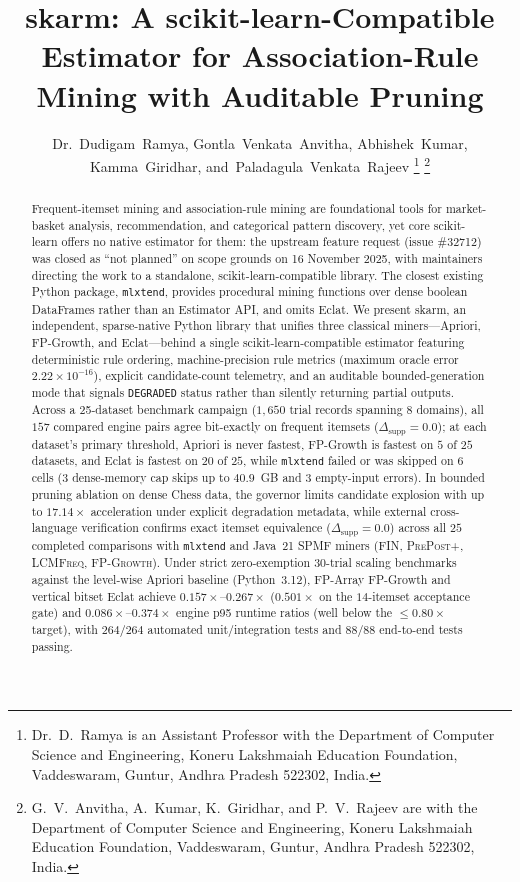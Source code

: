 \documentclass[journal,a4paper]{IEEEtran}
\title{skarm: A scikit-learn-Compatible Estimator for Association-Rule
Mining with Auditable Pruning}
\author{Dr.~Dudigam~Ramya,
        Gontla~Venkata~Anvitha,
        Abhishek~Kumar,
        Kamma~Giridhar,
        and~Paladagula~Venkata~Rajeev%
\thanks{Dr.~D.~Ramya is an Assistant Professor with the Department of Computer Science and Engineering, Koneru Lakshmaiah Education Foundation, Vaddeswaram, Guntur, Andhra Pradesh 522302, India.}%
\thanks{G.~V.~Anvitha, A.~Kumar, K.~Giridhar, and P.~V.~Rajeev are with the Department of Computer Science and Engineering, Koneru Lakshmaiah Education Foundation, Vaddeswaram, Guntur, Andhra Pradesh 522302, India.}%
}
\newcommand{\skarm}{skarm\xspace}
\begin{document}
\maketitle

\begin{abstract}
Frequent-itemset mining and association-rule mining are foundational tools
for market-basket analysis, recommendation, and categorical pattern
discovery, yet core scikit-learn offers no native estimator for them:
the upstream feature request (issue \#32712) was closed as ``not planned'' on
scope grounds on 16 November 2025, with maintainers directing the work to a
standalone, scikit-learn-compatible library. The closest existing Python
package, \texttt{mlxtend}, provides procedural mining functions over dense
boolean DataFrames rather than an Estimator API, and omits Eclat. We present
\skarm, an independent, sparse-native Python library that unifies three
classical miners---Apriori, FP-Growth, and Eclat---behind a single
scikit-learn-compatible estimator featuring deterministic rule ordering,
machine-precision rule metrics (maximum oracle error $2.22\times 10^{-16}$),
explicit candidate-count telemetry, and an auditable bounded-generation mode
that signals \texttt{DEGRADED} status rather than silently returning partial
outputs. Across a 25-dataset benchmark campaign ($1{,}650$ trial records
spanning 8 domains), all $157$ compared engine pairs agree bit-exactly on
frequent itemsets ($\Delta_{\mathrm{supp}} = 0.0$); at each dataset's
primary threshold, Apriori is never fastest, FP-Growth is fastest on $5$ of
$25$ datasets, and Eclat is fastest on $20$ of $25$, while \texttt{mlxtend}
failed or was skipped on $6$ cells ($3$ dense-memory cap skips up to
$40.9$~GB and $3$ empty-input errors). In bounded pruning ablation on dense
Chess data, the governor limits candidate explosion with up to
$17.14\times$ acceleration under explicit degradation metadata, while
external cross-language verification confirms exact itemset equivalence
($\Delta_{\mathrm{supp}} = 0.0$) across all $25$ completed comparisons
with \texttt{mlxtend} and Java~21 SPMF miners (\textsc{FIN},
\textsc{PrePost+}, \textsc{LCMFreq}, \textsc{FP-Growth}). Under strict
zero-exemption 30-trial scaling benchmarks against the level-wise Apriori
baseline (Python~3.12), FP-Array FP-Growth and vertical bitset Eclat
achieve $0.157\times$--$0.267\times$ ($0.501\times$ on the $14$-itemset
acceptance gate) and $0.086\times$--$0.374\times$ engine p95 runtime
ratios (well below the $\le 0.80\times$ target), with $264/264$ automated
unit/integration tests and $88/88$ end-to-end tests passing.
\end{abstract}
\end{document}
